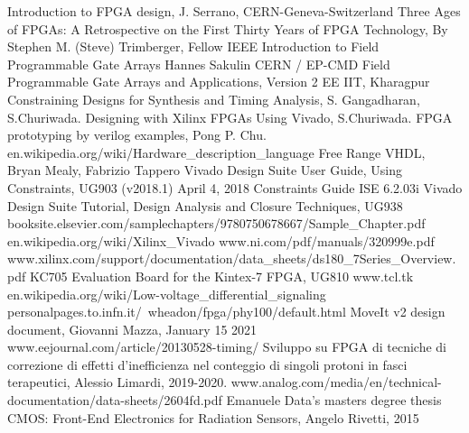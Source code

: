 \begin{thebibliography}{00}
	Introduction to FPGA design, J. Serrano, CERN-Geneva-Switzerland
	Three Ages of FPGAs: A Retrospective on the First Thirty Years of FPGA Technology, By Stephen M. (Steve) Trimberger, Fellow IEEE
	Introduction to Field Programmable Gate Arrays Hannes Sakulin CERN / EP-CMD
	Field Programmable Gate Arrays and Applications, Version 2 EE IIT, Kharagpur
	Constraining Designs for Synthesis and Timing Analysis, S. Gangadharan, S.Churiwada.
	Designing with Xilinx FPGAs Using Vivado, S.Churiwada.
	FPGA prototyping by verilog examples, Pong P. Chu.
	en.wikipedia.org/wiki/Hardware\_description\_language
	Free Range VHDL, Bryan Mealy, Fabrizio Tappero
	Vivado Design Suite User Guide, Using Constraints, UG903 (v2018.1) April 4, 2018
	Constraints Guide ISE 6.2.03i
	Vivado Design Suite Tutorial, Design Analysis and Closure Techniques, UG938
	booksite.elsevier.com/samplechapters/9780750678667/Sample\_Chapter.pdf
	en.wikipedia.org/wiki/Xilinx\_Vivado
	www.ni.com/pdf/manuals/320999e.pdf
	www.xilinx.com/support/documentation/data\_sheets/ds180\_7Series\_Overview.pdf
	KC705 Evaluation Board for the Kintex-7 FPGA, UG810	
	www.tcl.tk
	en.wikipedia.org/wiki/Low-voltage\_differential\_signaling
	personalpages.to.infn.it/~wheadon/fpga/phy100/default.html
	MoveIt v2 design document, Giovanni Mazza, January 15 2021
	www.eejournal.com/article/20130528-timing/
	Sviluppo su FPGA di tecniche di correzione di effetti d'inefficienza nel conteggio di singoli protoni in fasci terapeutici, Alessio Limardi, 2019-2020.
	www.analog.com/media/en/technical-documentation/data-sheets/2604fd.pdf
	Emanuele Data's masters degree thesis
	 CMOS: Front-End Electronics for Radiation Sensors, Angelo Rivetti, 2015
	
	
\end{thebibliography}
